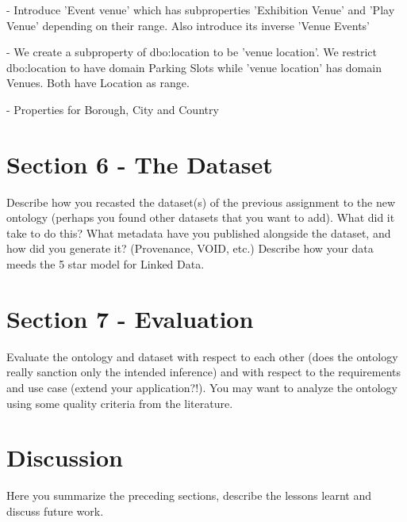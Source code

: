 \documentclass[runningheads,a4paper]{../../StyleFiles/llncs}
\begin{document}
- Introduce 'Event venue' which has subproperties 'Exhibition Venue' and 'Play Venue' depending on their range. Also introduce its inverse 'Venue Events'

- We create a subproperty of dbo:location to be 'venue location'. We restrict dbo:location to have domain Parking Slots while 'venue location' has domain Venues. Both have Location as range.

- Properties for Borough, City and Country


\section{Section 6 - The Dataset}
Describe how you recasted the dataset(s) of the previous assignment to the new ontology (perhaps you found other datasets that you want to add). What did it take to do this? What metadata have you published alongside the dataset, and how did you generate it? (Provenance, VOID, etc.) Describe how your data meeds the 5 star model for Linked Data.

\section{Section 7 - Evaluation}
Evaluate the ontology and dataset with respect to each other (does the ontology really sanction only the intended inference) and with respect to the requirements and use case (extend your application?!). You may want to analyze the ontology using some quality criteria from the literature.

\section{Discussion}
Here you summarize the preceding sections, describe the lessons learnt and discuss future work.




\end{document}
